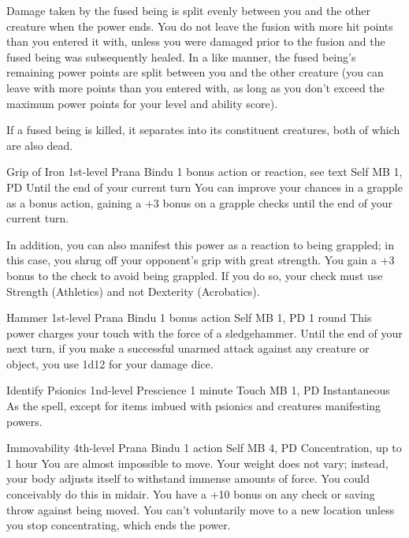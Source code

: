 Damage taken by the fused being is split evenly
between you and the other creature when the power ends.
You do not leave the fusion with more hit points
than you entered it with,
unless you were damaged prior to the fusion
and the fused being was subsequently healed.
In a like manner,
the fused being's remaining power points are split
between you and the other creature
(you can leave with more points than you entered with,
as long as you don't exceed the maximum power points
for your level and ability score).

If a fused being is killed,
it separates into its constituent creatures,
both of which are also dead.

\DndPowerHeader%
  {Grip of Iron}
  {1st-level Prana Bindu}
  {1 bonus action or reaction, see text}
  {Self}
  {MB 1, PD \lvlone}
  {Until the end of your current turn}
You can improve your chances in a grapple as a bonus action,
gaining a +3 bonus on a grapple checks until
the end of your current turn.

In addition, you can also manifest this power
as a reaction to being grappled; in this case, you shrug
off your opponent's grip with great strength.
You gain a +3 bonus to the check to avoid being grappled.
If you do so,
your check must use Strength (Athletics) and not
Dexterity (Acrobatics).

\DndPowerHeader%
  {Hammer}
  {1st-level Prana Bindu}
  {1 bonus action}
  {Self}
  {MB 1, PD \lvlone}
  {1 round}
This power charges your touch with the force of a sledgehammer.
Until the end of your next turn,
if you make a successful unarmed attack against any creature or object,
you use 1d12 for your damage dice.

\DndPowerHeader%
  {Identify Psionics}
  {1nd-level Prescience}
  {1 minute}
  {Touch}
  {MB 1, PD \lvlone}
  {Instantaneous}
As the  spell,
except for items imbued with psionics
and creatures manifesting powers.

\DndPowerHeader%
  {Immovability}
  {4th-level Prana Bindu}
  {1 action}
  {Self}
  {MB 4, PD \lvlfour}
  {Concentration, up to 1 hour}
  You are almost impossible to move.
Your weight does not vary;
instead, your body adjusts itself to withstand
immense amounts of force.
You could conceivably do this in midair.
You have a +10 bonus on any check or saving throw
against being moved.
You can't voluntarily move to a new location
unless you stop concentrating, which ends the power.

